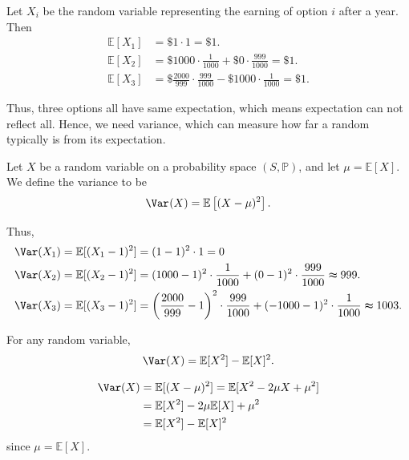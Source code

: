 Let \(X_i\) be the random variable representing the earning of option \(i\) after a year. Then 
\begin{align*}
    \mathbb{E} [X_1] &= \$ 1 \cdot 1 = \$ 1. \\
    \mathbb{E} [X_2] &= \$ 1000 \cdot \frac{1}{1000} + \$ 0 \cdot \frac{999}{1000} = \$ 1. \\
    \mathbb{E} [X_3] &= \$ \frac{2000}{999} \cdot \frac{999}{1000} - \$ 1000 \cdot \frac{1}{1000} = \$ 1.
\end{align*} 

Thus, three options all have same expectation, which means expectation can not reflect all. Hence, we need variance, which can measure how far a random typically is from its expectation.

\begin{definition}[Variance]
    Let \(X\) be a random variable on a probability space \((S, \mathbb{P} )\), and let \(\mu = \mathbb{E} [X]\). We define the variance to be 
    \[
        \Var_{}(X) = \mathbb{E} \left[ (X - \mu )^2 \right]. 
    \]   
\end{definition}

Thus, 
\begin{align*}
    \Var (X_1) &= \mathbb{E} [(X_1 - 1)^2] = (1 - 1)^2 \cdot 1 = 0 \\
    \Var (X_2) &= \mathbb{E} [(X_2 - 1)^2] = (1000 - 1)^2 \cdot \frac{1}{1000} + (0 - 1)^2 \cdot \frac{999}{1000} \thickapprox 999. \\
    \Var (X_3) &= \mathbb{E} [(X_3 - 1)^2] = \left( \frac{2000}{999} - 1 \right)^2 \cdot \frac{999}{1000} + (-1000 - 1)^2 \cdot \frac{1}{1000} \thickapprox 1003. 
\end{align*}

\begin{claim}
    For any random variable, 
    \[
        \Var(X) = \mathbb{E} [X^2] - \mathbb{E} [X]^2.
    \]
\end{claim}

\begin{explanation}
    \begin{align*}
        \Var (X) &= \mathbb{E} [(X - \mu )^2] = \mathbb{E} [X^2 - 2 \mu X + \mu ^2] \\
        &= \mathbb{E} [X^2] - 2\mu \mathbb{E} [X] + \mu ^2 \\
        &= \mathbb{E} [X^2] - \mathbb{E} [X]^2 
    \end{align*}
    since \(\mu = \mathbb{E} [X]\). 
\end{explanation}

